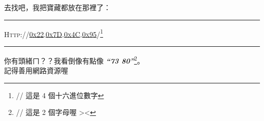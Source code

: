 \documentclass[12pt, a4paper]{article}
\begin{document}
	\begin{center}
		\vspace*{\fill}
		{\LARGE 去找吧，我把寶藏都放在那裡了：}\\[2em]
		{
			\hrule\vspace{1em}
			\Huge\scshape Http://\underline{0x22}.\underline{0x7D}.\underline{0x4C}.\underline{0x95}/\footnote{// 這是 4 個十六進位數字}\\[0.75em]
			\hrule
		}
		\vspace*{\fill}
		{\Large 你有頭緒ㄇ？？我看倒像有點像 \textit{\bfseries``73 80''}\footnote{// 這是 2 個字母喔 ><}。}\\
		\vspace*{\fill}
		記得善用網路資源喔
    \end{center}
\end{document}
